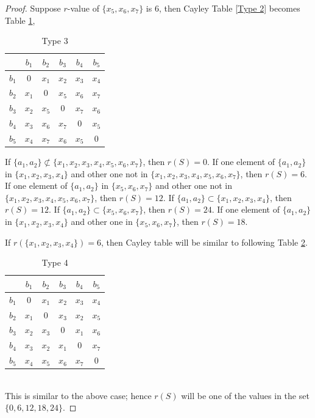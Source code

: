 \documentclass[12pt,a4paper]{article}
\begin{document}
\begin{proof}
		Suppose $r$-value of $\{x_5,x_6,x_7\}$ is 6, then Cayley Table \ref{Type 2} becomes Table \ref{Type 3}, 
		\begin{table}[h]
			\caption{Type 3}
			\label{Type 3}
			\begin{center}
				\begin{tabular}{c||c|c|c|c|c}
					
					&$b_1$ 	&$b_2$ &$b_3$ &$b_4$ &$b_5$ \\
					\hline
					\hline
					$b_1$	&0		&$x_1$ 	&$x_2$ 	&$x_3$ 		&$x_4$ \\
					\hline
					$b_2$	&$x_1$ 	&0 		&$x_5$ 	&$x_6$ 		&$x_7$ \\
					\hline
					$b_3$	&$x_2$ 	&$x_5$ 	&0 		&$x_7$ 		&$x_6$ \\
					\hline	
					$b_4$	&$x_3$ 	&$x_6$ 	&$x_7$ 	&0 			&$x_{5}$ \\
					\hline
					$b_5$	&$x_4$ 	&$x_7$ 	&$x_6$ 	&$x_{5}$	&0 \\
				\end{tabular}
			\end{center}
		\end{table}
		If $\{a_1,a_2\}\not\subset\{x_1,x_2,x_3,x_4,x_5,x_6,x_7\}$, then $r(S)=0$. If one element of $\{a_1,a_2\}$ in $\{x_1,x_2,x_3,x_4\}$ and other one not in $\{x_1,x_2,x_3,x_4,x_5,x_6,x_7\}$, then $r(S)=6$. If one element of $\{a_1,a_2\}$ in $\{x_5,x_6,x_7\}$ and other one not in $\{x_1,x_2,x_3,x_4,x_5,x_6,x_7\}$, then $r(S)=12$. If $\{a_1,a_2\}\subset\{x_1,x_2,x_3,x_4\}$, then $r(S)=12$. If $\{a_1,a_2\}\subset\{x_5,x_6,x_7\}$, then $r(S)=24$. If one element of $\{a_1,a_2\}$ in $\{x_1,x_2,x_3,x_4\}$ and other one in $\{x_5,x_6,x_7\}$, then $r(S)=18$.
		
		If $r(\{x_1,x_2,x_3,x_4\})=6$, then Cayley table will be similar to following Table \ref{Type 4}. 
		\begin{table}[h]
			\caption{Type 4}
			\label{Type 4}
			\begin{center}
				\begin{tabular}{c||c|c|c|c|c}
					
					&$b_1$ 	&$b_2$ &$b_3$ &$b_4$ &$b_5$ \\
					\hline
					\hline
					$b_1$	&0		&$x_1$ 	&$x_2$ 	&$x_3$ 	&$x_4$ \\
					\hline
					$b_2$	&$x_1$ 	&0 		&$x_3$ 	&$x_2$ 	&$x_5$ \\
					\hline
					$b_3$	&$x_2$ 	&$x_3$ 	&0 		&$x_1$ 	&$x_6$ \\
					\hline	
					$b_4$	&$x_3$ 	&$x_2$ 	&$x_1$ 	&0 		&$x_7$ \\
					\hline
					$b_5$	&$x_4$ 	&$x_5$ 	&$x_6$ 	&$x_7$	&0 \\
				\end{tabular}
			\end{center}
		\end{table}
		\\	This is similar  to the above case; hence $r(S)$ will be one of the values in the set $\{0,6,12,18,24\}$.
		
	\end{proof}
	
\end{document}
